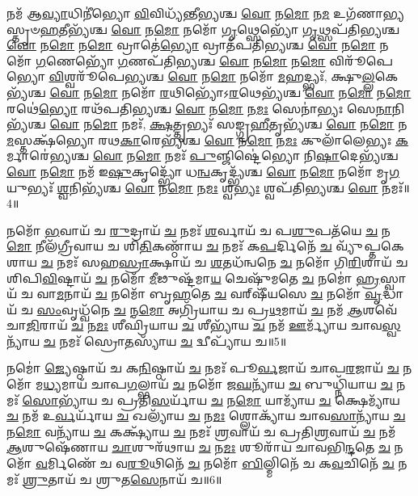 𑌨𑌮᳴ 𑌆\-\ul{𑌵𑍍𑌯𑌾}\-𑌧𑌿𑌨𑍀॑𑌭𑍍𑌯𑍋 \ul{𑌵𑌿}\-𑌵𑌿𑌧𑍍𑌯᳴𑌨𑍍𑌤𑍀𑌭𑍍𑌯𑌶𑍍𑌚 \ul{𑌵𑍋} 𑌨\-\ul{𑌮𑍋} 𑌨\-\ul{𑌮} 𑌉𑌗᳴𑌣𑌾𑌭𑍍𑌯𑌸𑍍𑌤𑍃𑍞\-\-\ul{𑌹}\-𑌤𑍀𑌭𑍍𑌯᳴𑌶𑍍𑌚 \ul{𑌵𑍋} 𑌨\-\ul{𑌮𑍋} 𑌨𑌮𑍋᳴ \ul{𑌗𑍃}\-𑌥𑍍𑌸𑍇𑌭𑍍𑌯𑍋᳴ \ul{𑌗𑍃}\-𑌥𑍍𑌸𑌪᳴𑌤𑌿𑌭𑍍𑌯𑌶𑍍𑌚 \ul{𑌵𑍋} 𑌨\-\ul{𑌮𑍋} 𑌨\-\ul{𑌮𑍋} 𑌵𑍍𑌰𑌾𑌤𑍇॑\-\ul{𑌭𑍍𑌯𑍋} 𑌵𑍍𑌰𑌾𑌤᳴𑌪𑌤𑌿𑌭𑍍𑌯𑌶𑍍𑌚 \ul{𑌵𑍋} 𑌨\-\ul{𑌮𑍋} 𑌨𑌮𑍋᳴ \ul{𑌗}\-𑌣𑍇𑌭𑍍𑌯𑍋᳴ \ul{𑌗}\-𑌣𑌪᳴𑌤𑌿𑌭𑍍𑌯𑌶𑍍𑌚 \ul{𑌵𑍋} 𑌨\-\ul{𑌮𑍋} 𑌨\-\ul{𑌮𑍋} 𑌵𑌿𑌰𑍂᳴𑌪𑍇𑌭𑍍𑌯𑍋 \ul{𑌵𑌿}\-𑌶𑍍𑌵𑌰𑍂᳴𑌪𑍇𑌭𑍍𑌯𑌶𑍍𑌚 \ul{𑌵𑍋} 𑌨\-\ul{𑌮𑍋} 𑌨𑌮𑍋᳴ \ul{𑌮}\-𑌹𑌦𑍍𑌭𑍍𑌯𑌃᳴, 𑌕𑍍𑌷𑍁\-\ul{𑌲𑍍𑌲}\-𑌕𑍇𑌭𑍍𑌯᳴𑌶𑍍𑌚 \ul{𑌵𑍋} 𑌨\-\ul{𑌮𑍋} 𑌨𑌮𑍋᳴ \ul{𑌰}\-𑌥𑌿𑌭𑍍𑌯𑍋᳴𑌽\-\ul{𑌰}\-𑌥𑍇𑌭𑍍𑌯᳴𑌶𑍍𑌚 \ul{𑌵𑍋} 𑌨\-\ul{𑌮𑍋} 𑌨\-\ul{𑌮𑍋} 𑌰𑌥𑍇॑\-\ul{𑌭𑍍𑌯𑍋} 𑌰𑌥᳴𑌪𑌤𑌿𑌭𑍍𑌯𑌶𑍍𑌚 \ul{𑌵𑍋} 𑌨\-\ul{𑌮𑍋} 𑌨\-\ul{𑌮𑌃} 𑌸𑍇𑌨𑌾॑𑌭𑍍𑌯𑌃 𑌸𑍇\-\ul{𑌨𑌾}\-𑌨𑌿𑌭𑍍𑌯᳴𑌶𑍍𑌚 \ul{𑌵𑍋} 𑌨\-\ul{𑌮𑍋} 𑌨𑌮𑌃᳴, \ul{𑌕𑍍𑌷}\-𑌤𑍍𑌤𑍃𑌭𑍍𑌯𑌃᳴ 𑌸𑌙𑍍𑌗𑍍𑌰\-\ul{𑌹𑍀}\-𑌤𑍃𑌭𑍍𑌯᳴𑌶𑍍𑌚 \ul{𑌵𑍋} 𑌨\-\ul{𑌮𑍋} 𑌨\-\ul{𑌮}\-𑌸𑍍𑌤𑌕𑍍𑌷᳴𑌭𑍍𑌯𑍋 𑌰𑌥\-\ul{𑌕𑌾}\-𑌰𑍇𑌭𑍍𑌯᳴𑌶𑍍𑌚 \ul{𑌵𑍋} 𑌨\-\ul{𑌮𑍋} 𑌨\-\ul{𑌮𑌃} 𑌕𑍁𑌲𑌾᳴𑌲𑍇𑌭𑍍𑌯𑌃 \ul{𑌕}\-𑌰𑍍𑌮𑌾𑌰𑍇॑𑌭𑍍𑌯𑌶𑍍𑌚 \ul{𑌵𑍋} 𑌨\-\ul{𑌮𑍋} 𑌨𑌮𑌃᳴ \ul{𑌪𑍁}\-𑌞𑍍𑌜𑌿𑌷𑍍𑌟𑍇॑𑌭𑍍𑌯𑍋 𑌨𑌿\-\ul{𑌷𑌾}\-𑌦𑍇𑌭𑍍𑌯᳴𑌶𑍍𑌚 \ul{𑌵𑍋} 𑌨\-\ul{𑌮𑍋} 𑌨𑌮᳴ 𑌇\-\ul{𑌷𑍁}\-𑌕𑍃𑌦𑍍𑌭𑍍𑌯𑍋᳴ 𑌧\-\ul{𑌨𑍍𑌵}\-𑌕𑍃𑌦𑍍𑌭𑍍𑌯᳴𑌶𑍍𑌚 \ul{𑌵𑍋} 𑌨\-\ul{𑌮𑍋} 𑌨𑌮𑍋᳴ 𑌮𑍃\-\ul{𑌗}\-𑌯𑍁𑌭𑍍𑌯𑌃᳴ \ul{𑌶𑍍𑌵}\-𑌨𑌿𑌭𑍍𑌯᳴𑌶𑍍𑌚 \ul{𑌵𑍋} 𑌨\-\ul{𑌮𑍋} 𑌨\-\ul{𑌮𑌃} 𑌶𑍍𑌵\-\ul{𑌭𑍍𑌯𑌃} 𑌶𑍍𑌵𑌪᳴𑌤𑌿𑌭𑍍𑌯𑌶𑍍𑌚 \ul{𑌵𑍋} 𑌨𑌮𑌃᳴॥4॥ 

𑌨𑌮𑍋᳴ \ul{𑌭}\-𑌵𑌾𑌯᳴ 𑌚 \ul{𑌰𑍁}\-𑌦𑍍𑌰𑌾𑌯᳴ \ul{𑌚} 𑌨𑌮𑌃᳴ \ul{𑌶}\-𑌰𑍍𑌵𑌾𑌯᳴ 𑌚 𑌪\-\ul{𑌶𑍁}\-𑌪𑌤᳴𑌯𑍇 \ul{𑌚} 𑌨\-\ul{𑌮𑍋} 𑌨𑍀𑌲᳴𑌗𑍍𑌰𑍀𑌵𑌾𑌯 𑌚 𑌶𑌿\-\ul{𑌤𑌿}\-𑌕𑌣𑍍𑌠𑌾᳴𑌯 \ul{𑌚} 𑌨𑌮𑌃᳴ 𑌕\-\ul{𑌪}\-𑌰𑍍𑌦𑌿𑌨𑍇᳴ \ul{𑌚} 𑌵𑍍𑌯𑍁᳴𑌪𑍍𑌤𑌕𑍇𑌶𑌾𑌯 \ul{𑌚} 𑌨𑌮𑌃᳴ 𑌸𑌹\-\ul{𑌸𑍍𑌰𑌾}\-𑌕𑍍𑌷𑌾𑌯᳴ 𑌚 \ul{𑌶}\-𑌤𑌧᳴𑌨𑍍𑌵𑌨𑍇 \ul{𑌚} 𑌨𑌮𑍋᳴ 𑌗𑌿\-\ul{𑌰𑌿}\-𑌶𑌾𑌯᳴ 𑌚 𑌶𑌿𑌪𑌿\-\ul{𑌵𑌿}\-𑌷𑍍𑌟𑌾𑌯᳴ \ul{𑌚} 𑌨𑌮𑍋᳴ \ul{𑌮𑍀}\-𑌢𑍁𑌷𑍍𑌟᳴𑌮𑌾\-\ul{𑌯} 𑌚𑍇𑌷𑍁᳴𑌮𑌤𑍇 \ul{𑌚} 𑌨𑌮𑍋॑ \ul{𑌹𑍍𑌰}\-𑌸𑍍𑌵𑌾𑌯᳴ 𑌚 𑌵𑌾\-\ul{𑌮}\-𑌨𑌾𑌯᳴ \ul{𑌚} 𑌨𑌮𑍋᳴ 𑌬𑍃\-\ul{𑌹}\-𑌤𑍇 \ul{𑌚} 𑌵𑌰𑍍‌𑌷𑍀᳴𑌯𑌸𑍇 \ul{𑌚} 𑌨𑌮𑍋᳴ \ul{𑌵𑍃}\-𑌦𑍍𑌧𑌾𑌯᳴ 𑌚 \ul{𑌸𑌂}\-𑌵𑍃𑌧𑍍𑌵᳴𑌨𑍇 \ul{𑌚} 𑌨\-\ul{𑌮𑍋} 𑌅𑌗𑍍𑌰𑌿᳴𑌯𑌾𑌯 𑌚 𑌪𑍍𑌰\-\ul{𑌥}\-𑌮𑌾𑌯᳴ \ul{𑌚} 𑌨𑌮᳴ \ul{𑌆}\-𑌶𑌵𑍇᳴ 𑌚𑌾\-\ul{𑌜𑌿}\-𑌰𑌾𑌯᳴ \ul{𑌚} 𑌨\-\ul{𑌮𑌃} 𑌶𑍀𑌘𑍍𑌰𑌿᳴𑌯𑌾𑌯 \ul{𑌚} 𑌶𑍀𑌭𑍍𑌯𑌾᳴𑌯 \ul{𑌚} 𑌨𑌮᳴ \ul{𑌊}\-𑌰𑍍𑌮𑍍𑌯𑌾᳴𑌯 𑌚𑌾𑌵\-\ul{𑌸𑍍𑌵}\-𑌨𑍍𑌯𑌾᳴𑌯 \ul{𑌚} 𑌨𑌮𑌃᳴ 𑌸𑍍𑌰𑍋\-\ul{𑌤}\-𑌸𑍍𑌯𑌾᳴𑌯 \ul{𑌚} 𑌦𑍍𑌵𑍀𑌪𑍍𑌯𑌾᳴𑌯 𑌚॥5॥ 

𑌨𑌮𑍋॑ \ul{𑌜𑍍𑌯𑍇}\-𑌷𑍍𑌠𑌾𑌯᳴ 𑌚 𑌕\-\ul{𑌨𑌿}\-𑌷𑍍𑌠𑌾𑌯᳴ \ul{𑌚} 𑌨𑌮𑌃᳴ 𑌪𑍂\-\ul{𑌰𑍍𑌵}\-𑌜𑌾𑌯᳴ 𑌚𑌾𑌪\-\ul{𑌰}\-𑌜𑌾𑌯᳴ \ul{𑌚} 𑌨𑌮𑍋᳴ 𑌮\-\ul{𑌧𑍍𑌯}\-𑌮𑌾𑌯᳴ 𑌚𑌾𑌪\-\ul{𑌗}\-𑌲𑍍𑌭𑌾𑌯᳴ \ul{𑌚} 𑌨𑌮𑍋᳴ 𑌜\-\ul{𑌘}\-𑌨𑍍𑌯𑌾᳴𑌯 \ul{𑌚} 𑌬𑍁𑌧𑍍𑌨𑌿᳴𑌯𑌾𑌯 \ul{𑌚} 𑌨𑌮𑌃᳴ \ul{𑌸𑍋}\-𑌭𑍍𑌯𑌾᳴𑌯 𑌚 𑌪𑍍𑌰𑌤𑌿\-\ul{𑌸}\-𑌰𑍍𑌯𑌾᳴𑌯 \ul{𑌚} 𑌨\-\ul{𑌮𑍋} 𑌯𑌾𑌮𑍍𑌯𑌾᳴𑌯 \ul{𑌚} 𑌕𑍍𑌷𑍇𑌮𑍍𑌯𑌾᳴𑌯 \ul{𑌚} 𑌨𑌮᳴ 𑌉\-\ul{𑌰𑍍𑌵}\-𑌰𑍍𑌯𑌾᳴𑌯 \ul{𑌚} 𑌖𑌲𑍍𑌯𑌾᳴𑌯 \ul{𑌚} 𑌨\-\ul{𑌮𑌃} 𑌶𑍍𑌲𑍋𑌕𑍍𑌯𑌾᳴𑌯 𑌚𑌾𑌵\-\ul{𑌸𑌾}\-𑌨𑍍𑌯𑌾᳴𑌯 \ul{𑌚} 𑌨\-\ul{𑌮𑍋} 𑌵𑌨𑍍𑌯𑌾᳴𑌯 \ul{𑌚} 𑌕𑌕𑍍𑌷𑍍𑌯𑌾᳴𑌯 \ul{𑌚} 𑌨𑌮𑌃᳴ \ul{𑌶𑍍𑌰}\-𑌵𑌾𑌯᳴ 𑌚 𑌪𑍍𑌰𑌤𑌿\-\ul{𑌶𑍍𑌰}\-𑌵𑌾𑌯᳴ \ul{𑌚} 𑌨𑌮᳴ \ul{𑌆}\-𑌶𑍁𑌷𑍇᳴𑌣𑌾𑌯 \ul{𑌚𑌾}\-𑌶𑍁𑌰᳴𑌥𑌾𑌯 \ul{𑌚} 𑌨\-\ul{𑌮𑌃} 𑌶𑍂𑌰𑌾᳴𑌯 𑌚𑌾𑌵𑌭𑌿\-\ul{𑌨𑍍𑌦}\-𑌤𑍇 \ul{𑌚} 𑌨𑌮𑍋᳴ \ul{𑌵}\-𑌰𑍍𑌮𑌿𑌣𑍇᳴ 𑌚 𑌵\-\ul{𑌰𑍂}\-𑌥𑌿𑌨𑍇᳴ \ul{𑌚} 𑌨𑌮𑍋᳴ \ul{𑌬𑌿}\-𑌲𑍍𑌮𑌿𑌨𑍇᳴ 𑌚 𑌕\-\ul{𑌵}\-𑌚𑌿𑌨𑍇᳴ \ul{𑌚} 𑌨𑌮𑌃᳴ \ul{𑌶𑍍𑌰𑍁}\-𑌤𑌾𑌯᳴ 𑌚 𑌶𑍍𑌰𑍁𑌤\-\ul{𑌸𑍇}\-𑌨𑌾𑌯᳴ 𑌚॥6॥ 

